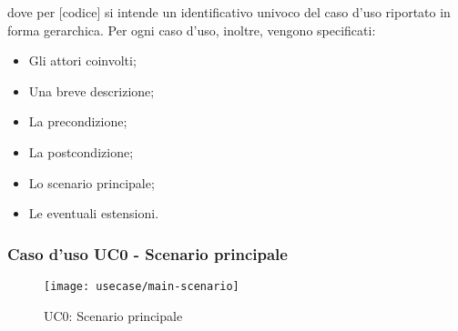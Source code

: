 dove per [codice] si intende un identificativo univoco del caso d'uso riportato in forma gerarchica. Per ogni caso d'uso, inoltre, vengono specificati:
\begin{itemize}
  \item Gli attori coinvolti;
  \item Una breve descrizione;
  \item La precondizione;
  \item La postcondizione;
  \item Lo scenario principale;
  \item Le eventuali estensioni.
\end{itemize}

\subsubsection{Caso d'uso UC0 - Scenario principale}
\begin{figure}[!ht]
  \begin{center}
    \texttt{[image: usecase/main-scenario]}
    \caption{UC0: Scenario principale}
    \label{fig:uc0}
  \end{center}
\end{figure}

